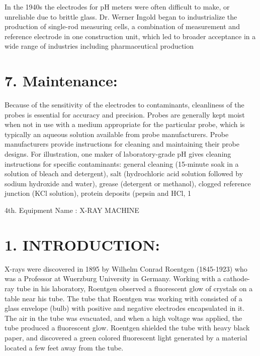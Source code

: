 \documentclass[12pt]{article}
\begin{document}
 In the 1940s the electrodes for pH meters were often difficult to make, or unreliable due to brittle glass. Dr. Werner Ingold began to industrialize the production of single-rod measuring cells, a combination of measurement and reference electrode in one construction unit, which led to broader acceptance in a wide range of industries including pharmaceutical production
 
 \section*{7. Maintenance:}
 Because of the sensitivity of the electrodes to contaminants, cleanliness of the probes is essential for accuracy and precision. Probes are generally kept moist when not in use with a medium appropriate for the particular probe, which is typically an aqueous solution available from probe manufacturers. Probe manufacturers provide instructions for cleaning and maintaining their probe designs. For illustration, one maker of laboratory-grade pH gives cleaning instructions for specific contaminants: general cleaning (15-minute soak in a solution of bleach and detergent), salt (hydrochloric acid solution followed by sodium hydroxide and water), grease (detergent or methanol), clogged reference junction (KCl solution), protein deposits (pepsin and HCl, 1%
 
\maketitle
\clearpage
4th. Equipment Name :  X-RAY MACHINE

\section*{1.  INTRODUCTION:}
  X-rays were discovered in 1895 by Wilhelm Conrad Roentgen (1845-1923) who was a Professor at Wuerzburg University in Germany. Working with a cathode-ray tube in his laboratory, Roentgen observed a fluorescent glow of crystals on a table near his tube. The tube that Roentgen was working with consisted of a glass envelope (bulb) with positive and negative electrodes encapsulated in it. The air in the tube was evacuated, and when a high voltage was applied, the tube produced a fluorescent  glow. Roentgen shielded the tube with heavy black paper, and discovered a green colored fluorescent light generated by a material located a few feet away from the tube.
  
\end{document}
